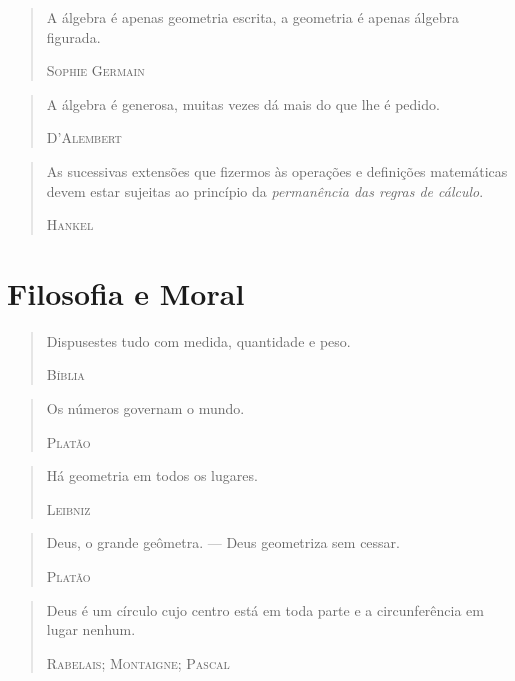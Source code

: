 \documentclass{hipatia}
\begin{document}
\begin{quote}
A álgebra é apenas geometria escrita, a geometria é apenas álgebra figurada.

\hfill \textsc{Sophie Germain}
\end{quote}
 


\begin{quote}
    A álgebra é generosa, muitas vezes dá mais do que lhe é pedido.
    
\hfill \textsc{D'Alembert}
\end{quote}

 
\begin{quote}
As sucessivas extensões que fizermos às operações e definições matemáticas devem estar sujeitas ao princípio da \emph{permanência das regras de cálculo}.

\hfill \textsc{Hankel}
\end{quote}
 
\section{Filosofia e Moral}

\begin{quote}
Dispusestes tudo com medida, quantidade e peso.

\hfill \textsc{Bíblia}
\end{quote}

\begin{quote}
Os números governam o mundo.

\hfill \textsc{Platão}
\end{quote}
 
\begin{quote}
Há geometria em todos os lugares.

\hfill \textsc{Leibniz}
\end{quote}

 
\begin{quote}
Deus, o grande geômetra. --- Deus geometriza sem cessar.

\hfill \textsc{Platão}
\end{quote}
 

\begin{quote}
Deus é um círculo cujo centro está em toda parte e a circunferência em lugar nenhum.

\hfill \textsc{Rabelais; Montaigne; Pascal}
\end{quote}
\end{document}
